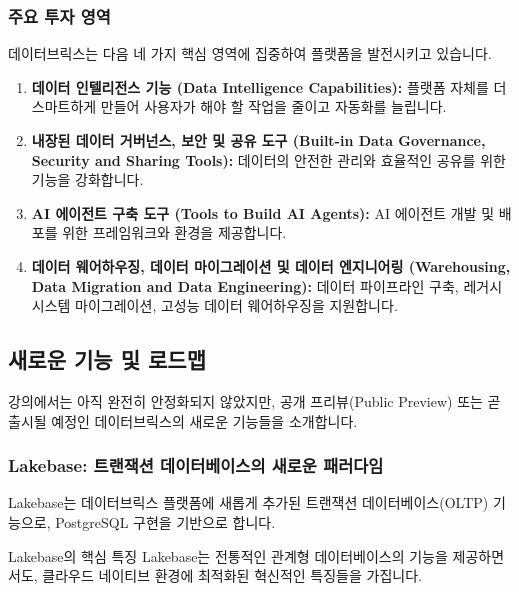 \documentclass[11pt,a4paper]{article}
\begin{document}
\subsubsection{주요 투자 영역}
데이터브릭스는 다음 네 가지 핵심 영역에 집중하여 플랫폼을 발전시키고 있습니다.
\begin{enumerate}
    \item \textbf{데이터 인텔리전스 기능 (Data Intelligence Capabilities):} 플랫폼 자체를 더 스마트하게 만들어 사용자가 해야 할 작업을 줄이고 자동화를 늘립니다.
    \item \textbf{내장된 데이터 거버넌스, 보안 및 공유 도구 (Built-in Data Governance, Security and Sharing Tools):} 데이터의 안전한 관리와 효율적인 공유를 위한 기능을 강화합니다.
    \item \textbf{AI 에이전트 구축 도구 (Tools to Build AI Agents):} AI 에이전트 개발 및 배포를 위한 프레임워크와 환경을 제공합니다.
    \item \textbf{데이터 웨어하우징, 데이터 마이그레이션 및 데이터 엔지니어링 (Warehousing, Data Migration and Data Engineering):} 데이터 파이프라인 구축, 레거시 시스템 마이그레이션, 고성능 데이터 웨어하우징을 지원합니다.
\end{enumerate}

\subsection{새로운 기능 및 로드맵}

강의에서는 아직 완전히 안정화되지 않았지만, 공개 프리뷰(Public Preview) 또는 곧 출시될 예정인 데이터브릭스의 새로운 기능들을 소개합니다.

\subsubsection{Lakebase: 트랜잭션 데이터베이스의 새로운 패러다임}
Lakebase는 데이터브릭스 플랫폼에 새롭게 추가된 트랜잭션 데이터베이스(OLTP) 기능으로, PostgreSQL 구현을 기반으로 합니다.

\begin{summarybox}{Lakebase의 핵심 특징}
Lakebase는 전통적인 관계형 데이터베이스의 기능을 제공하면서도, 클라우드 네이티브 환경에 최적화된 혁신적인 특징들을 가집니다.
\end{summarybox}
\end{document}
